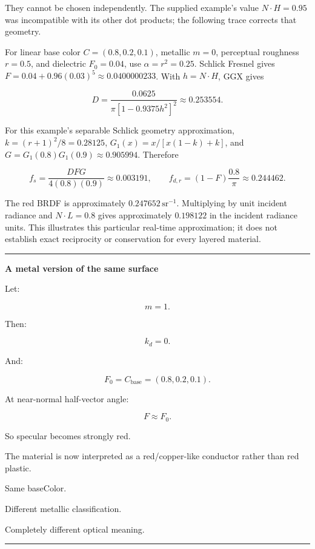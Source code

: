 They cannot be chosen independently. The supplied example's value \(N\cdot H=0.95\) was incompatible with its other dot products; the following trace corrects that geometry.

For linear base color \(C=(0.8,0.2,0.1)\), metallic \(m=0\), perceptual roughness \(r=0.5\), and dielectric \(F_0=0.04\), use \(\alpha=r^2=0.25\). Schlick Fresnel gives \(F=0.04+0.96(0.03)^5\approx0.0400000233\). With \(h=N\cdot H\), GGX gives

\[
D=\frac{0.0625}{\pi[1-0.9375h^2]^2}\approx0.253554.
\]

For this example's separable Schlick geometry approximation, \(k=(r+1)^2/8=0.28125\), \(G_1(x)=x/[x(1-k)+k]\), and \(G=G_1(0.8)G_1(0.9)\approx0.905994\). Therefore

\[
f_s=\frac{DFG}{4(0.8)(0.9)}\approx0.003191,
\qquad f_{d,r}=(1-F)\frac{0.8}{\pi}\approx0.244462.
\]

The red BRDF is approximately \(0.247652\,\mathrm{sr}^{-1}\). Multiplying by unit incident radiance and \(N\cdot L=0.8\) gives approximately \(0.198122\) in the incident radiance units. This illustrates this particular real-time approximation; it does not establish exact reciprocity or conservation for every layered material.

\begin{center}\rule{0.5\linewidth}{0.5pt}\end{center}

\textbf{A metal version of the same surface}

Let:

\[
m=1.
\]

Then:

\[
k_d=0.
\]

And:

\[
F_0=C_{\text{base}}
=
(0.8,0.2,0.1).
\]

At near-normal half-vector angle:

\[
F\approx F_0.
\]

So specular becomes strongly red.

The material is now interpreted as a red/copper-like conductor rather than red plastic.

Same baseColor.

Different metallic classification.

Completely different optical meaning.

\begin{center}\rule{0.5\linewidth}{0.5pt}\end{center}

